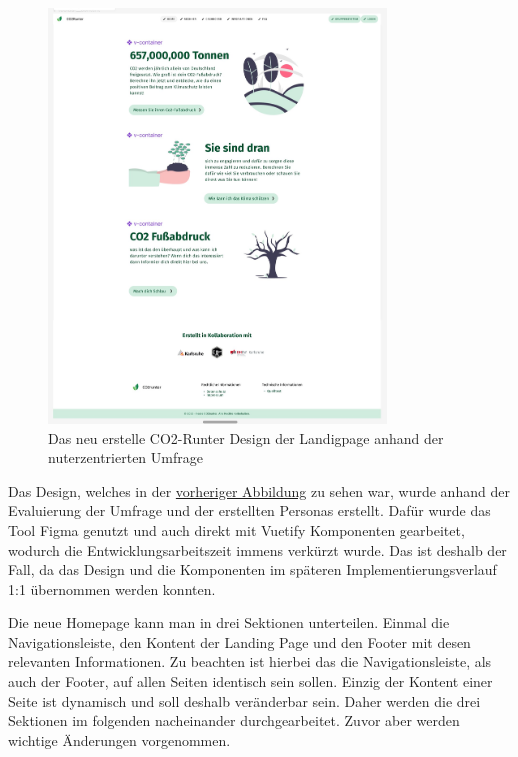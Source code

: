 \begin{figure}[h]
    \centering
    \includegraphics[width=0.8\textwidth]{images/06/HomePage-Design.jpeg}
    \caption{Das neu erstelle CO2-Runter Design der Landigpage anhand der nuterzentrierten Umfrage}
    \label{fig:new-co2runter-homepage-design}
\end{figure}

Das Design, welches in der \hyperref[fig:new-co2runter-homepage-design]{vorheriger Abbildung} zu sehen war, wurde anhand der Evaluierung der Umfrage und der erstellten Personas erstellt.
Dafür wurde das Tool Figma genutzt und auch direkt mit Vuetify Komponenten gearbeitet, wodurch die Entwicklungsarbeitszeit immens verkürzt wurde.
Das ist deshalb der Fall, da das Design und die Komponenten im späteren Implementierungsverlauf 1:1 übernommen werden konnten.

Die neue Homepage kann man in drei Sektionen unterteilen.
Einmal die Navigationsleiste, den Kontent der Landing Page und den Footer mit desen relevanten Informationen.
Zu beachten ist hierbei das die Navigationsleiste, als auch der Footer, auf allen Seiten identisch sein sollen.
Einzig der Kontent einer Seite ist dynamisch und soll deshalb veränderbar sein.
Daher werden die drei Sektionen im folgenden nacheinander durchgearbeitet.
Zuvor aber werden wichtige Änderungen vorgenommen.

